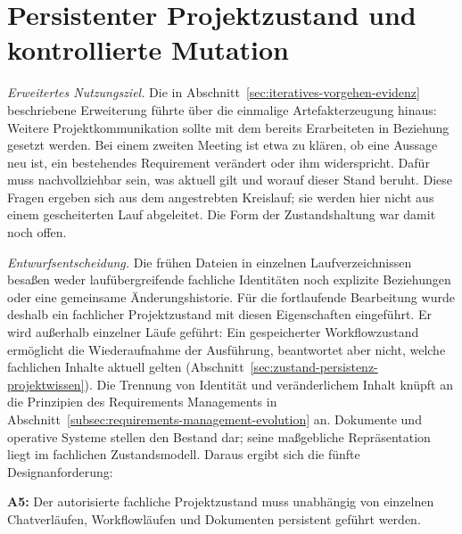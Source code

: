 \section{Persistenter Projektzustand und kontrollierte Mutation}
\label{sec:projektzustand-kontrollierte-mutation}

\emph{Erweitertes Nutzungsziel.} Die in
Abschnitt~\ref{sec:iteratives-vorgehen-evidenz} beschriebene Erweiterung
führte über die einmalige Artefakterzeugung hinaus: Weitere
Projektkommunikation sollte mit dem bereits Erarbeiteten in Beziehung
gesetzt werden. Bei einem zweiten Meeting ist etwa zu klären, ob eine
Aussage neu ist, ein bestehendes Requirement verändert oder ihm
widerspricht. Dafür muss nachvollziehbar sein, was aktuell gilt und
worauf dieser Stand beruht. Diese Fragen ergeben sich aus dem
angestrebten Kreislauf; sie werden hier nicht aus einem gescheiterten
Lauf abgeleitet. Die Form der Zustandshaltung war damit noch offen.

\emph{Entwurfsentscheidung.} Die frühen Dateien in einzelnen
Laufverzeichnissen besaßen weder laufübergreifende fachliche
Identitäten noch explizite Beziehungen oder eine gemeinsame
Änderungshistorie. Für die fortlaufende Bearbeitung wurde deshalb ein
fachlicher Projektzustand mit diesen Eigenschaften eingeführt.
Er wird außerhalb einzelner Läufe geführt: Ein gespeicherter
Workflowzustand ermöglicht die Wiederaufnahme der Ausführung,
beantwortet aber nicht, welche fachlichen Inhalte aktuell gelten
(Abschnitt~\ref{sec:zustand-persistenz-projektwissen}). Die Trennung
von Identität und veränderlichem Inhalt knüpft an die Prinzipien des
Requirements Managements in
Abschnitt~\ref{subsec:requirements-management-evolution} an.
Dokumente und operative Systeme stellen den Bestand dar; seine
maßgebliche Repräsentation liegt im fachlichen Zustandsmodell.
Daraus ergibt sich die fünfte Designanforderung:

\textbf{A5:} Der autorisierte fachliche Projektzustand muss unabhängig
von einzelnen Chatverläufen, Workflowläufen und Dokumenten persistent
geführt werden.

